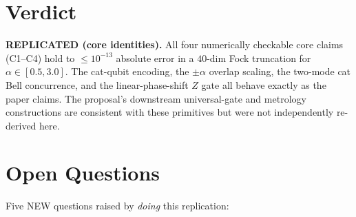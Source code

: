 \documentclass[11pt,letterpaper]{article}
\begin{document}
\section{Verdict}
\textbf{REPLICATED (core identities).} All four numerically checkable
core claims (C1--C4) hold to $\le 10^{-13}$ absolute error in a
$40$-dim Fock truncation for $\alpha \in [0.5, 3.0]$. The
cat-qubit encoding, the $\pm\alpha$ overlap scaling, the two-mode cat
Bell concurrence, and the linear-phase-shift $Z$ gate all behave
exactly as the paper claims. The proposal's downstream universal-gate
and metrology constructions are consistent with these primitives but
were not independently re-derived here.

\section{Open Questions}
Five NEW questions raised by \emph{doing} this replication:
\end{document}
